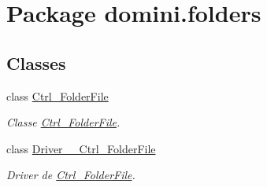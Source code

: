 \hypertarget{namespacedomini_1_1folders}{}\section{Package domini.\+folders}
\label{namespacedomini_1_1folders}
\subsection*{Classes}
\begin{DoxyCompactItemize}
\item 
class \hyperlink{classdomini_1_1folders_1_1Ctrl__FolderFile}{Ctrl\+\_\+\+Folder\+File}
\begin{DoxyCompactList}\small\item\em Classe \hyperlink{classdomini_1_1folders_1_1Ctrl__FolderFile}{Ctrl\+\_\+\+Folder\+File}. \end{DoxyCompactList}\item 
class \hyperlink{classdomini_1_1folders_1_1Driver____Ctrl__FolderFile}{Driver\+\_\+\+\_\+\+Ctrl\+\_\+\+Folder\+File}
\begin{DoxyCompactList}\small\item\em Driver de \hyperlink{classdomini_1_1folders_1_1Ctrl__FolderFile}{Ctrl\+\_\+\+Folder\+File}. \end{DoxyCompactList}\end{DoxyCompactItemize}
